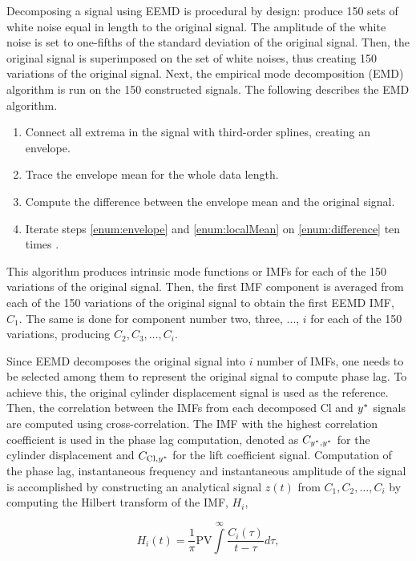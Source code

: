 \documentclass[oneside]{utmthesis}
\begin{document}
Decomposing a signal using EEMD is procedural by design: produce 150 sets of white noise equal in length to the original signal. The amplitude of the white noise is set to one-fifths of the standard deviation of the original signal. Then, the original signal is superimposed on the set of white noises, thus creating 150 variations of the original signal. Next, the empirical mode decomposition (EMD) algorithm is run on the 150 constructed signals. The following describes the EMD algorithm.

\begin{enumerate} \label{enumerate:emd}
  \item Connect all extrema in the signal with third-order splines, creating an envelope. \label{enum:envelope}
  \item Trace the envelope mean for the whole data length. \label{enum:localMean}
  \item Compute the difference between the envelope mean and the original signal. \label{enum:difference}
  \item Iterate steps \ref{enum:envelope} and \ref{enum:localMean} on \ref{enum:difference} ten times \citep{Wu2008}.
\end{enumerate}

This algorithm produces intrinsic mode functions or IMFs for each of the 150 variations of the original signal. Then, the first IMF component is averaged from each of the 150 variations of the original signal to obtain the first EEMD IMF, $C_{1}$. The same is done for component number two, three, ..., $i$ for each of the 150 variations, producing $C_{2},C_{3},\dots,C_{i}$.

Since EEMD decomposes the original signal into $i$ number of IMFs, one needs to be selected among them to represent the original signal to compute phase lag. To achieve this, the original cylinder displacement signal is used as the reference. Then, the correlation between the IMFs from each decomposed Cl and $y^{*}$ signals are computed using cross-correlation. The IMF with the highest correlation coefficient is used in the phase lag computation, denoted as $C_{y^{*},y^{*}}$ for the cylinder displacement and $C_{\text{Cl},y^{*}}$ for the lift coefficient signal. Computation of the phase lag, instantaneous frequency and instantaneous amplitude of the signal is accomplished by constructing an analytical signal $z \left( t \right)$ from $C_{1},C_{2},\dots,C_{i}$ by computing the Hilbert transform of the IMF, $H_{i}$,

\begin{equation}
  H_{i} \left( t \right) = \frac{1}{\pi} \text{PV} \int\limits_{}^{\infty} \frac{C_{i} \left( \tau \right)}{t - \tau} d\tau,
  \label{eq:hilbertTransform}
\end{equation}
\end{document}
